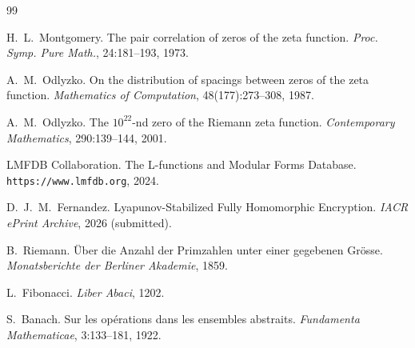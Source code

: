 \documentclass[11pt,a4paper]{article}
\begin{document}
\begin{thebibliography}{99}

H.~L.~Montgomery.
\newblock The pair correlation of zeros of the zeta function.
\newblock \emph{Proc. Symp. Pure Math.}, 24:181--193, 1973.

A.~M.~Odlyzko.
\newblock On the distribution of spacings between zeros of the zeta function.
\newblock \emph{Mathematics of Computation}, 48(177):273--308, 1987.

A.~M.~Odlyzko.
\newblock The $10^{22}$-nd zero of the Riemann zeta function.
\newblock \emph{Contemporary Mathematics}, 290:139--144, 2001.

LMFDB Collaboration.
\newblock The L-functions and Modular Forms Database.
\newblock \texttt{https://www.lmfdb.org}, 2024.

D.~J.~M.~Fernandez.
\newblock Lyapunov-Stabilized Fully Homomorphic Encryption.
\newblock \emph{IACR ePrint Archive}, 2026 (submitted).

B.~Riemann.
\newblock \"Uber die Anzahl der Primzahlen unter einer gegebenen Gr\"osse.
\newblock \emph{Monatsberichte der Berliner Akademie}, 1859.

L.~Fibonacci.
\newblock \emph{Liber Abaci}, 1202.

S.~Banach.
\newblock Sur les op\'erations dans les ensembles abstraits.
\newblock \emph{Fundamenta Mathematicae}, 3:133--181, 1922.

\end{thebibliography}
\end{document}
